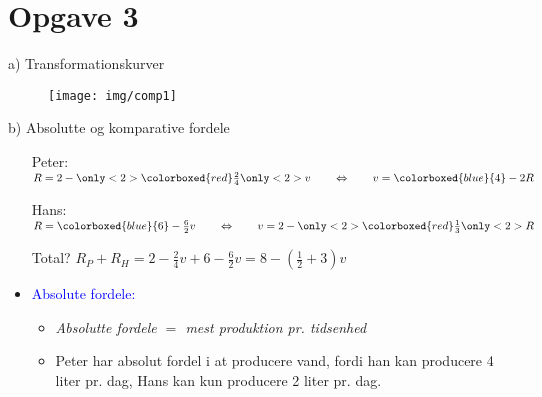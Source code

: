 \section{Opgave 3}


\begin{frame}{a) Transformationskurver}

    \begin{figure}
    \centering
        \texttt{[image: img/comp1]}
  \end{figure}

\end{frame}


\begin{frame}{b) Absolutte og komparative fordele}


  \begin{itemize}
    \item[Peter:] $R = 2 - \only<2>{\colorboxed{red}} {\frac{2}{4} \only<2>{}} v \qquad \Leftrightarrow \qquad v = \colorboxed{blue}{4}-2R$
    \item[Hans:] $R = \colorboxed{blue}{6} - \frac{6}{2}v \qquad \Leftrightarrow \qquad v = 2 - \only<2>{\colorboxed{red}}{\frac{1}{3} \only<2>{}}R$
    \item[]
    \item[Total?] $R_P + R_H = 2 - \frac{2}{4}v +  6 - \frac{6}{2}v = 8 - (\frac{1}{2} + 3)v$
  \end{itemize}

\begin{itemize}
  \item \textcolor{blue}{Absolute fordele:}
  \begin{itemize}
    \item \textit{Absolutte fordele $=$ mest produktion pr. tidsenhed}
    \item Peter har absolut fordel i at producere vand, fordi han kan producere 4 liter pr. dag, Hans kan kun producere 2 liter pr. dag.
  \end{itemize}
\end{itemize}

\end{frame}

